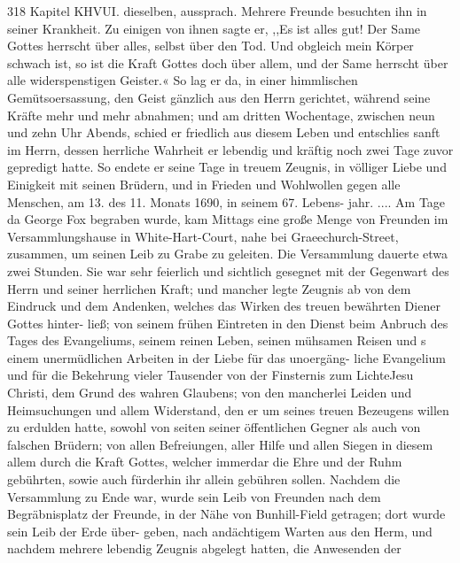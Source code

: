 318 Kapitel KHVUI.
dieselben, aussprach. Mehrere Freunde besuchten ihn in seiner
Krankheit. Zu einigen von ihnen sagte er, ,,Es ist alles gut! Der
Same Gottes herrscht über alles, selbst über den Tod. Und obgleich
mein Körper schwach ist, so ist die Kraft Gottes doch über allem,
und der Same herrscht über alle widerspenstigen Geister.«
So lag er da, in einer himmlischen Gemütsoersassung, den
Geist gänzlich aus den Herrn gerichtet, während seine Kräfte mehr
und mehr abnahmen; und am dritten Wochentage, zwischen neun
und zehn Uhr Abends, schied er friedlich aus diesem Leben und
entschlies sanft im Herrn, dessen herrliche Wahrheit er lebendig
und kräftig noch zwei Tage zuvor gepredigt hatte. So endete
er seine Tage in treuem Zeugnis, in völliger Liebe und Einigkeit
mit seinen Brüdern, und in Frieden und Wohlwollen gegen alle
Menschen, am 13. des 11. Monats 1690, in seinem 67. Lebens-
jahr. ....
Am Tage da George Fox begraben wurde, kam Mittags
eine große Menge von Freunden im Versammlungshause in
White-Hart-Court, nahe bei Graeechurch-Street, zusammen, um
seinen Leib zu Grabe zu geleiten. Die Versammlung dauerte
etwa zwei Stunden. Sie war sehr feierlich und sichtlich gesegnet
mit der Gegenwart des Herrn und seiner herrlichen Kraft; und
mancher legte Zeugnis ab von dem Eindruck und dem Andenken,
welches das Wirken des treuen bewährten Diener Gottes hinter-
ließ; von seinem frühen Eintreten in den Dienst beim Anbruch des
Tages des Evangeliums, seinem reinen Leben, seinen mühsamen Reisen
und s einem unermüdlichen Arbeiten in der Liebe für das unoergäng-
liche Evangelium und für die Bekehrung vieler Tausender von der
Finsternis zum LichteJesu Christi, dem Grund des wahren Glaubens;
von den mancherlei Leiden und Heimsuchungen und allem Widerstand,
den er um seines treuen Bezeugens willen zu erdulden hatte, sowohl
von seiten seiner öffentlichen Gegner als auch von falschen Brüdern;
von allen Befreiungen, aller Hilfe und allen Siegen in diesem
allem durch die Kraft Gottes, welcher immerdar die Ehre und
der Ruhm gebührten, sowie auch fürderhin ihr allein gebühren sollen.
Nachdem die Versammlung zu Ende war, wurde sein Leib
von Freunden nach dem Begräbnisplatz der Freunde, in der Nähe
von Bunhill-Field getragen; dort wurde sein Leib der Erde über-
geben, nach andächtigem Warten aus den Herm, und nachdem
mehrere lebendig Zeugnis abgelegt hatten, die Anwesenden der


